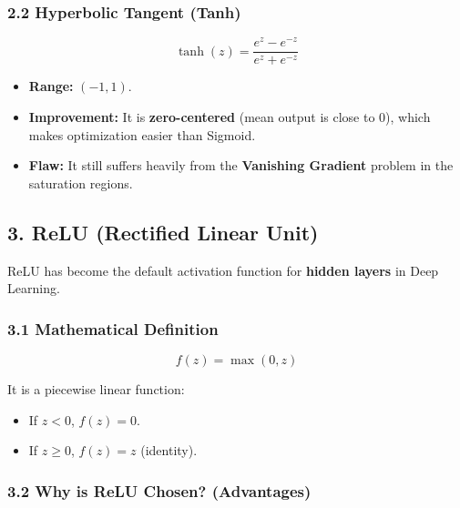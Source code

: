 \documentclass[
  italian,
  11pt,
]{article}
\begin{document}
\subsubsection{2.2 Hyperbolic Tangent
(Tanh)}\label{hyperbolic-tangent-tanh}

\[\tanh(z) = \frac{e^z - e^{-z}}{e^z + e^{-z}}\]

\begin{itemize}
\item
  \textbf{Range:} \((-1, 1)\).
\item
  \textbf{Improvement:} It is \textbf{zero-centered} (mean output is
  close to 0), which makes optimization easier than Sigmoid.
\item
  \textbf{Flaw:} It still suffers heavily from the \textbf{Vanishing
  Gradient} problem in the saturation regions.
\end{itemize}

\subsection{3. ReLU (Rectified Linear
Unit)}\label{relu-rectified-linear-unit}

ReLU has become the default activation function for \textbf{hidden
layers} in Deep Learning.

\subsubsection{3.1 Mathematical
Definition}\label{mathematical-definition-1}

\[f(z) = \max(0, z)\]

It is a piecewise linear function:

\begin{itemize}
\item
  If \(z < 0\), \(f(z) = 0\).
\item
  If \(z \geq 0\), \(f(z) = z\) (identity).
\end{itemize}

\subsubsection{3.2 Why is ReLU Chosen?
(Advantages)}\label{why-is-relu-chosen-advantages}
\end{document}
